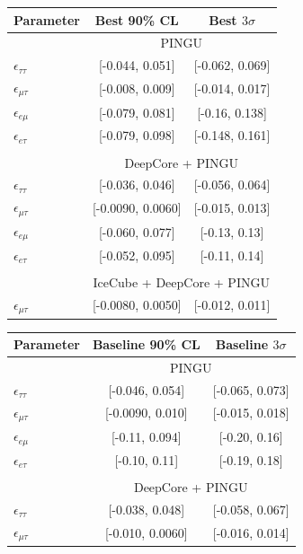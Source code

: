 \documentclass{revtex4-2}
\newcommand{\emt}{\ensuremath{\epsilon_{\mu\tau}}}
\newcommand{\eet}{\epsilon_{e\tau}}
\newcommand{\eem}{\epsilon_{e\mu}}
\newcommand{\ett}{\ensuremath{\epsilon_{\tau\tau}}}
\begin{document}
{{ \begin{table}
    \centering
    \begin{tabular}{lcc}
       \hline
       Parameter & Best 90\% CL & Best $3\sigma$\\
       \hline & \multicolumn{2}{c}{PINGU} \\
       $\ett$ &  [-0.044, 0.051] &  [-0.062, 0.069] \\
       $\emt$ &  [-0.008, 0.009] &  [-0.014, 0.017] \\
       $\eem$ &  [-0.079, 0.081] &   [-0.16, 0.138] \\
       $\eet$ &  [-0.079, 0.098] &  [-0.148, 0.161] \\\\
       & \multicolumn{2}{c}{DeepCore + PINGU} \\
       $\ett$ &  [-0.036, 0.046] &  [-0.056, 0.064] \\
       $\emt$ &  [-0.0090, 0.0060] &  [-0.015, 0.013] \\
       $\eem$ &   [-0.060, 0.077] &  [-0.13, 0.13] \\
       $\eet$ &  [-0.052, 0.095] &  [-0.11, 0.14] \\\\
       & \multicolumn{2}{c}{IceCube + DeepCore + PINGU}  \\
       $\emt$ &  [-0.0080, 0.0050] &  [-0.012, 0.011] \\
       \hline
    \end{tabular}
    \vspace{1em}
    \begin{tabular}{lcc}
       \hline 
       Parameter & Baseline 90\% CL & Baseline $3\sigma$\\
       \hline & \multicolumn{2}{c}{PINGU} \\
       $\ett$ &  [-0.046, 0.054] &  [-0.065, 0.073] \\
       $\emt$ &   [-0.0090, 0.010] &  [-0.015, 0.018] \\
       $\eem$ &  [-0.11, 0.094] &  [-0.20, 0.16] \\
       $\eet$ &   [-0.10, 0.11] &  [-0.19, 0.18] \\\\
       & \multicolumn{2}{c}{DeepCore + PINGU} \\
       $\ett$ &    [-0.038, 0.048] &  [-0.058, 0.067] \\
       $\emt$ &    [-0.010, 0.0060] &  [-0.016, 0.014] \\

\end{tabular}
\end{table}}}
\end{document}
